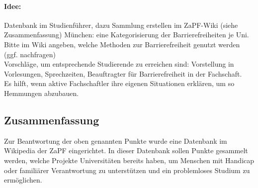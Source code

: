     \paragraph{Idee:}
      Datenbank im Studienführer, dazu Sammlung erstellen im ZaPF-Wiki (siehe Zusammenfassung)
      München: eine Kategorisierung der Barrierefreiheiten je Uni.
      Bitte im Wiki angeben, welche Methoden zur Barrierefreiheit genutzt werden (ggf. nachfragen) \\

      Vorschläge, um entsprechende Studierende zu erreichen sind: Vorstellung in Vorlesungen, Sprechzeiten, Beauftragter für Barrierefreiheit in der Fachschaft. \\

      Es hilft, wenn aktive Fachschaftler ihre eigenen Situationen erklären, um so Hemmungen abzubauen.

    \subsection*{Zusammenfassung}
      Zur Beantwortung der oben genannten Punkte wurde eine Datenbank im Wikipedia der ZaPF eingerichtet.
      In dieser Datenbank sollen Punkte gesammelt werden, welche Projekte Universitäten bereits haben, um Menschen mit Handicap oder familiärer Verantwortung zu unterstützen und ein problemloses Studium zu ermöglichen.
